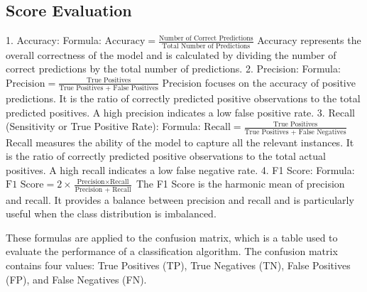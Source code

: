 \documentclass[11pt,a4paper]{article}
\begin{document}
\subsection{Score Evaluation}
1. Accuracy:
    \newline
   Formula: \( \text{Accuracy} = \frac{\text{Number of Correct Predictions}}{\text{Total Number of Predictions}} \)
   \newline
   Accuracy represents the overall correctness of the model and is calculated by dividing the number of correct predictions by the total number of predictions.
\newline
\hspace{0.2cm}2. Precision:
\newline
   Formula: \( \text{Precision} = \frac{\text{True Positives}}{\text{True Positives + False Positives}} \)
   \newline
   Precision focuses on the accuracy of positive predictions. It is the ratio of correctly predicted positive observations to the total predicted positives. A high precision indicates a low false positive rate.
\newline
\hspace{0.2cm}
3. Recall (Sensitivity or True Positive Rate):
   \newline
   Formula: \( \text{Recall} = \frac{\text{True Positives}}{\text{True Positives + False Negatives}} \)
   \newline
   Recall measures the ability of the model to capture all the relevant instances. It is the ratio of correctly predicted positive observations to the total actual positives. A high recall indicates a low false negative rate.
\newline
\hspace{0.2cm}
4. F1 Score:
\newline
   Formula: \( \text{F1 Score} = 2 \times \frac{\text{Precision} \times \text{Recall}}{\text{Precision + Recall}} \)
   \newline
   The F1 Score is the harmonic mean of precision and recall. It provides a balance between precision and recall and is particularly useful when the class distribution is imbalanced.

These formulas are applied to the confusion matrix, which is a table used to evaluate the performance of a classification algorithm. The confusion matrix contains four values: True Positives (TP), True Negatives (TN), False Positives (FP), and False Negatives (FN).
\end{document}
